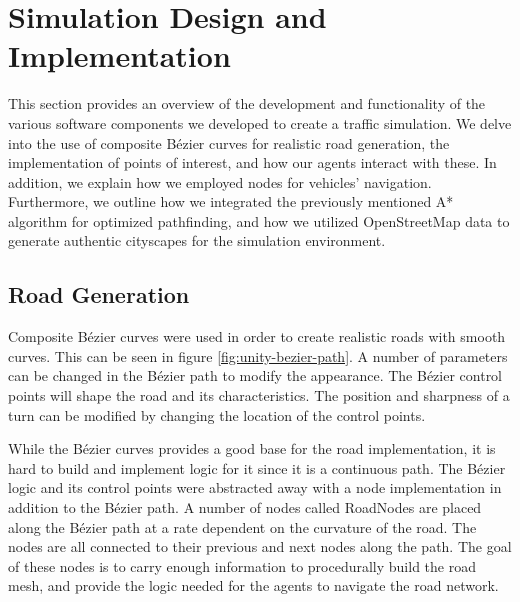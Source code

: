 \section{Simulation Design and Implementation}
    This section provides an overview of the development and functionality of the various software components we developed to create a traffic simulation. We delve into the use of composite Bézier curves for realistic road generation, the implementation of points of interest, and how our agents interact with these. In addition, we explain how we employed nodes for vehicles' navigation. Furthermore, we outline how we integrated the previously mentioned A* algorithm for optimized pathfinding, and how we utilized OpenStreetMap data to generate authentic cityscapes for the simulation environment.



    \subsection{Road Generation}
        Composite Bézier curves were used in order to create realistic roads with smooth curves. This can be seen in figure \ref{fig:unity-bezier-path}. A number of parameters can be changed in the Bézier path to modify the appearance. The Bézier control points will shape the road and its characteristics. The position and sharpness of a turn can be modified by changing the location of the control points.
        
    
        While the Bézier curves provides a good base for the road implementation, it is hard to build and implement logic for it since it is a continuous path. The Bézier logic and its control points were abstracted away with a node implementation in addition to the Bézier path. A number of nodes called RoadNodes are placed along the Bézier path at a rate dependent on the curvature of the road. The nodes are all connected to their previous and next nodes along the path. The goal of these nodes is to carry enough information to procedurally build the road mesh, and provide the logic needed for the agents to navigate the road network.
    
